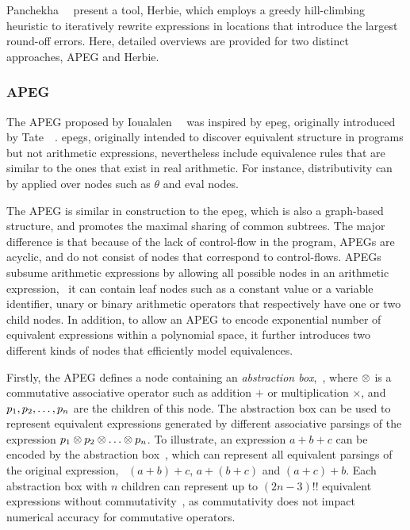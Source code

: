 Panchekha~\etal~\cite{panchekha15} present a tool, Herbie, which employs a
greedy hill-climbing heuristic to iteratively rewrite expressions in locations
that introduce the largest round-off errors.  Here, detailed overviews are
provided for two distinct approaches, APEG and Herbie.

\subsubsection{APEG}

The APEG proposed by Ioualalen~\etal~\cite{ioualalen} was inspired by
\gls{epeg}, originally introduced by Tate~\etal~\cite{tate09}\footnotemark[1].
\glspl{epeg}, originally intended to discover equivalent structure in programs
but not arithmetic expressions, nevertheless include equivalence rules
that are similar to the ones that exist in real arithmetic.  For instance,
distributivity can by applied over nodes such as $\theta$ and $\mathrm{eval}$
nodes.

The APEG is similar in construction to the \gls{epeg}, which is also a
graph-based structure, and promotes the maximal sharing of common subtrees.
The major difference is that because of the lack of control-flow in the
program, APEGs are acyclic, and do not consist of nodes that correspond to
control-flows.  APEGs subsume arithmetic expressions by allowing all possible
nodes in an arithmetic expression, \ie~it can contain leaf nodes such as a
constant value or a variable identifier, unary or binary arithmetic operators
that respectively have one or two child nodes.  In addition, to allow an APEG
to encode exponential number of equivalent expressions within a polynomial
space, it further introduces two different kinds of nodes that efficiently
model equivalences.

Firstly, the APEG defines a node containing an \emph{abstraction box},
\,, where
$\otimes$ is a commutative associative operator such as addition $+$ or
multiplication $\times$, and $p_1, p_2, \mathellipsis, p_n$ are the children of
this node.  The abstraction box can be used to represent equivalent expressions
generated by different associative parsings of the expression $p_1 \otimes
p_2 \otimes \mathellipsis \otimes p_n$.  To illustrate, an expression $a
+ b + c$ can be encoded by the abstraction box \,, which
can represent all equivalent parsings of the original expression, \ie~$(a
+ b) + c$, $a + (b + c)$ and $(a + c) + b$.  Each abstraction box with $n$
children can represent up to $(2n - 3){!!}$ equivalent expressions without
commutativity~\cite{ioualalen, mouilleron}, as commutativity does not impact
numerical accuracy for commutative operators.

